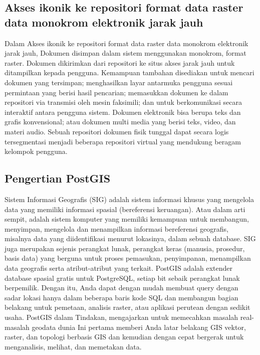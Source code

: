 \subsection{Akses ikonik ke repositori format data raster data monokrom elektronik jarak jauh}
Dalam Akses ikonik ke repositori format data raster data monokrom elektronik jarak jauh, 
Dokumen disimpan dalam sistem menggunakan monokrom, format raster. 
Dokumen dikirimkan dari repositori ke situs akses jarak jauh untuk ditampilkan kepada pengguna. 
Kemampuan tambahan disediakan untuk mencari dokumen yang tersimpan; 
menghasilkan layar antarmuka pengguna sesuai permintaan yang berisi hasil pencarian; 
memasukkan dokumen ke dalam repositori via transmisi oleh mesin faksimili; 
dan untuk berkomunikasi secara interaktif antara pengguna sistem. 
Dokumen elektronik bisa berupa teks dan grafis konvensional; 
atau dokumen multi media yang berisi teks, video, dan materi audio. 
Sebuah repositori dokumen fisik tunggal dapat secara logis tersegmentasi menjadi
beberapa repositori virtual yang mendukung beragam kelompok pengguna.

\subsection{Pengertian PostGIS}
Sistem Informasi Geografis (SIG) adalah sistem informasi khusus yang mengelola data yang memiliki informasi spasial (bereferensi keruangan). 
Atau dalam arti sempit, adalah sistem komputer yang memiliki kemampuan untuk membangun,
menyimpan, mengelola dan menampilkan informasi bereferensi geografis, misalnya data yang diidentifikasi menurut lokasinya, dalam sebuah database.
SIG juga merupakan sejenis perangkat lunak, perangkat keras (manusia, prosedur, basis data) yang berguna untuk proses pemasukan, penyimpanan, menampilkan data geografis serta atribut-atribut yang terkait.
PostGIS adalah extender database spasial gratis untuk PostgreSQL, 
setiap bit sebaik perangkat lunak berpemilik. Dengan itu, 
Anda dapat dengan mudah membuat query dengan sadar lokasi hanya dalam beberapa baris kode SQL 
dan membangun bagian belakang untuk pemetaan, analisis raster, 
atau aplikasi perutean dengan sedikit usaha. 
PostGIS dalam Tindakan, mengajarkan untuk memecahkan masalah real- 
masalah geodata dunia Ini pertama memberi Anda latar belakang GIS vektor,
raster, dan topologi berbasis GIS dan kemudian dengan cepat bergerak 
untuk menganalisis, melihat, dan memetakan data.

